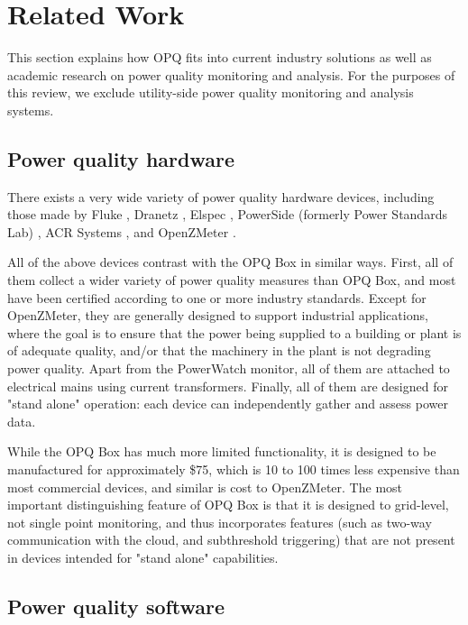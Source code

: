 \section{Related Work}
\label{sec:related-work}

This section explains how OPQ fits into current industry solutions as well as academic research on power quality monitoring and analysis. For the purposes of this review, we exclude utility-side power quality monitoring and analysis systems.

\subsection{Power quality hardware}
\label{sec:commercial-pq-devices}

There exists a very wide variety of power quality hardware devices, including those made by Fluke \cite{fluke_fluke_2020}, Dranetz \cite{dranetz_dranetz_2020}, Elspec \cite{elspec_elspec_2020}, PowerSide (formerly Power Standards Lab) \cite{powerside_powerside_2020}, ACR Systems \cite{acr_acr_2020}, and OpenZMeter \cite{viciana_openzmeter_2018}.

All of the above devices contrast with the OPQ Box in similar ways. First, all of them collect a wider variety of power quality measures than OPQ Box, and most have been certified according to one or more industry standards. Except for OpenZMeter, they are generally designed to support industrial applications, where the goal is to ensure that the power being supplied to a building or plant is of adequate quality, and/or that the machinery in the plant is not degrading power quality. Apart from the PowerWatch monitor, all of them are attached to electrical mains using current transformers. Finally, all of them are designed for "stand alone" operation: each device can independently gather and assess power data.

While the OPQ Box has much more limited functionality, it is designed to be manufactured for approximately \$75, which is 10 to 100 times less expensive than most commercial devices, and similar is cost to OpenZMeter. The most important distinguishing feature of OPQ Box is that it is designed to grid-level, not single point monitoring, and thus incorporates features (such as two-way communication with the cloud, and subthreshold triggering) that are not present in devices intended for "stand alone" capabilities.

\subsection{Power quality software}
\label{sec:commercial-pq-software}

